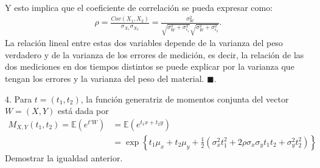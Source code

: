 \documentclass[11pt,letterpaper]{article}
\newcommand{\mE}{\mathbb{E}}
\newcommand{\fin}{$\blacksquare.$}
\begin{document}
Y esto implica que el coeficiente de correlación se pueda expresar como:
\begin{align*}
\rho=\frac{Cov(X_1,X_2)}{\sigma_{X_1}\sigma_{X_2}}=\frac{\sigma_W^2}{\sqrt{\sigma_W^2+\sigma_{\epsilon_1}^2}\sqrt{\sigma_W^2+\sigma_{\epsilon_2}^2}}.
\end{align*}
La relación lineal entre estas dos variables depende de la varianza del peso verdadero y de la varianza de los errores de medición, es decir, la relación de las dos mediciones en dos tiempos distintos se puede explicar por la varianza que tengan los errores y la varianza del peso del material. \fin

4. Para $t=(t_1, t_2)$, la función generatriz de momentos conjunta del vector $W=(X,Y)$ está dada por 
\begin{align*}
M_{X,Y}(t_1, t_2)= \mE(e^{t'W})&=\mE(e^{t_1x+t_2y})\\
&=\exp\left\{t_1\mu_x+t_2\mu_y+\frac{1}{2}(\sigma_x^2t_1^2+2\rho \sigma_x\sigma_y t_1t_2+\sigma_y^2t_2^2)\right\}
\end{align*}
Demostrar la igualdad anterior.
\end{document}
